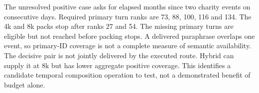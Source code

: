 The unresolved positive case asks for elapsed months since two charity events on consecutive days.
Required primary turn ranks are 73, 88, 100, 116 and 134.
The 4k and 8k packs stop after ranks 27 and 54.
The missing primary turns are eligible but not reached before packing stops.
A delivered paraphrase overlaps one event, so primary-ID coverage is not a complete measure of semantic availability.
The decisive pair is not jointly delivered by the executed route.
Hybrid can supply it at 8k but has lower aggregate positive coverage.
This identifies a candidate temporal composition operation to test, not a demonstrated benefit of budget alone.

\par
